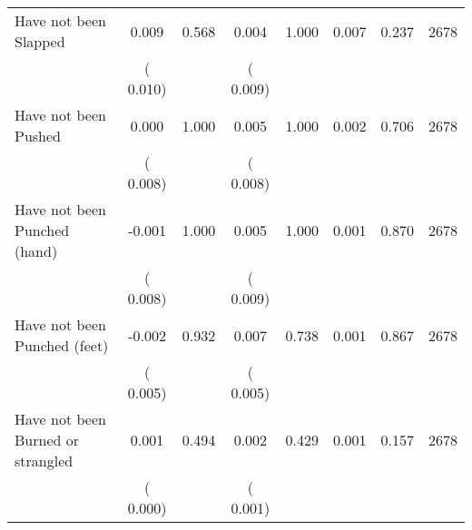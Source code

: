 \begin{tabular}{l*{7}{c}}
 Have not been Slapped       &              0.009       &        0.568  &              0.004       &        1.000  &              0.007       &              0.237 &  2678 \\ 
                       &       (       0.010)             &                               &       (       0.009)                     &                               &                                               &                                &                      \\ 

 Have not been Pushed       &              0.000       &        1.000  &              0.005       &        1.000  &              0.002       &              0.706 &  2678 \\ 
                       &       (       0.008)             &                               &       (       0.008)                     &                               &                                               &                                &                      \\ 

 Have not been Punched (hand)       &             -0.001       &        1.000  &              0.005       &        1.000  &              0.001       &              0.870 &  2678 \\ 
                       &       (       0.008)             &                               &       (       0.009)                     &                               &                                               &                                &                      \\ 

 Have not been Punched (feet)       &             -0.002       &        0.932  &              0.007       &        0.738  &              0.001       &              0.867 &  2678 \\ 
                       &       (       0.005)             &                               &       (       0.005)                     &                               &                                               &                                &                      \\ 

 Have not been Burned or strangled       &              0.001       &        0.494  &              0.002       &        0.429  &              0.001       &              0.157 &  2678 \\ 
                       &       (       0.000)             &                               &       (       0.001)                     &                               &                                               &                                &                      \\ 


\end{tabular}
